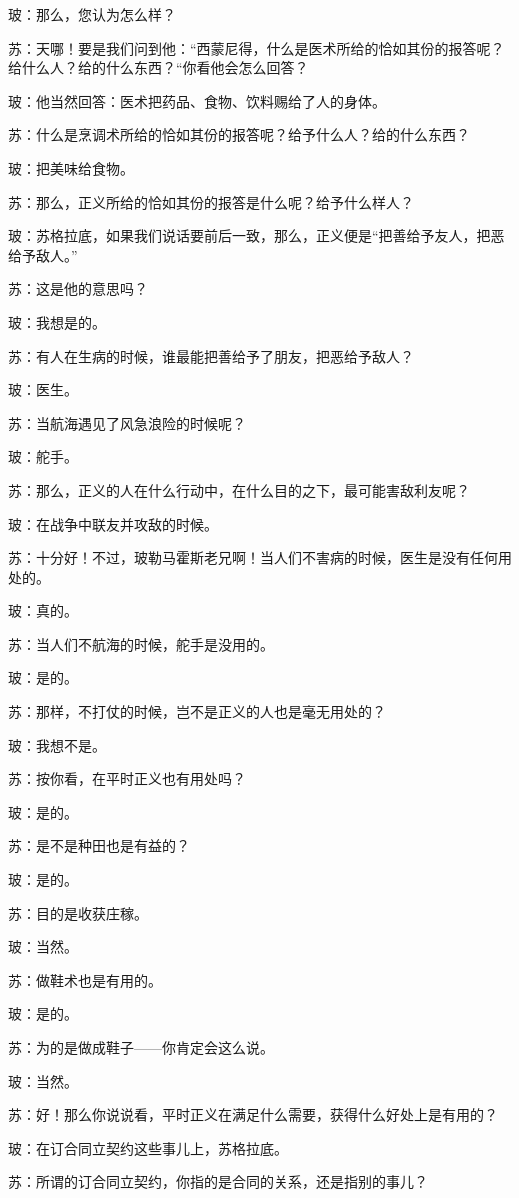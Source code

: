 \documentclass[11pt,oneside]{book}
\begin{document}
\begin{common-format}
玻：那么，您认为怎么样？

苏：天哪！要是我们问到他：“西蒙尼得，什么是医术所给的恰如其份的报答呢？给什么人？给的什么东西？“你看他会怎么回答？

玻：他当然回答：医术把药品、食物、饮料赐给了人的身体。

苏：什么是烹调术所给的恰如其份的报答呢？给予什么人？给的什么东西？

玻：把美味给食物。

苏：那么，正义所给的恰如其份的报答是什么呢？给予什么样人？

玻：苏格拉底，如果我们说话要前后一致，那么，正义便是“把善给予友人，把恶给予敌人。”

苏：这是他的意思吗？

玻：我想是的。

苏：有人在生病的时候，谁最能把善给予了朋友，把恶给予敌人？

玻：医生。

苏：当航海遇见了风急浪险的时候呢？

玻：舵手。

苏：那么，正义的人在什么行动中，在什么目的之下，最可能害敌利友呢？

玻：在战争中联友并攻敌的时候。

苏：十分好！不过，玻勒马霍斯老兄啊！当人们不害病的时候，医生是没有任何用处的。

玻：真的。

苏：当人们不航海的时候，舵手是没用的。

玻：是的。

苏：那样，不打仗的时候，岂不是正义的人也是毫无用处的？

玻：我想不是。

苏：按你看，在平时正义也有用处吗？

玻：是的。

苏：是不是种田也是有益的？

玻：是的。

苏：目的是收获庄稼。

玻：当然。

苏：做鞋术也是有用的。

玻：是的。

苏：为的是做成鞋子——你肯定会这么说。

玻：当然。

苏：好！那么你说说看，平时正义在满足什么需要，获得什么好处上是有用的？

玻：在订合同立契约这些事儿上，苏格拉底。

苏：所谓的订合同立契约，你指的是合同的关系，还是指别的事儿？


\end{common-format}
\end{document}
